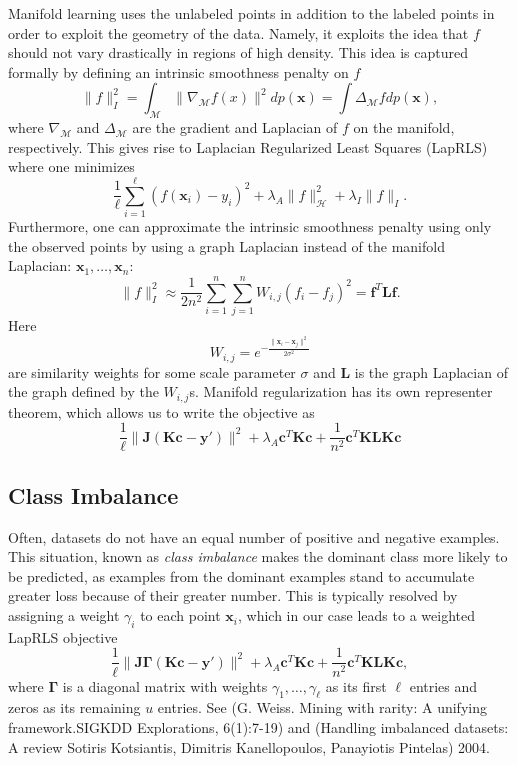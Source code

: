 \documentclass[anon,11pt]{9520} %
\newcommand{\mb}{\mathbf}
\begin{document}
Manifold learning uses the unlabeled points in addition to the labeled points in order to exploit the geometry of the data. \cite{Belkin} Namely, it exploits the idea that $f$ should not vary drastically in regions of high density. This idea is captured formally by defining an intrinsic smoothness penalty on $f$ \[\|f\|^2_{I} = \int_{\mathcal{M}} \|\nabla_{\mathcal{M}} f(x)\|^2 dp(\mb x) = \int\Delta_{\mathcal{M}}f dp(\mb x), \] where $\nabla_{\mathcal{M}}$ and $\Delta_{\mathcal{M}}$ are the gradient and Laplacian of $f$ on the manifold, respectively. This gives rise to Laplacian Regularized Least Squares (LapRLS) where one minimizes \[ \frac{1}{\ell} \sum_{i=1}^{\ell} (f(\mb{x}_i)-y_i)^2 + \lambda_A \|f\|_{\mathcal{H}}^2 + \lambda_I\|f\|_I.\] Furthermore, one can approximate the intrinsic smoothness penalty using only the observed points by using a graph Laplacian instead of the manifold Laplacian: $\mb x_1, \dots, \mb x_n$: \[\|f\|^2_I \approx \frac{1}{2n^2} \sum_{i=1}^{n} \sum_{j=1}^{n} W_{i,j}(f_i-f_j)^2 = \mb f^T \mb L \mb f.\] Here \[W_{i,j} = e^{-\frac{\|\mb{x}_i-\mb{x}_j\|^2}{2\sigma^2}}\] are similarity weights for some scale parameter $\sigma$ and $\mb L$ is the graph Laplacian of the graph defined by the $W_{i,j}$s. Manifold regularization has its own representer theorem, which allows us to write the objective as
\[ \frac{1}{\ell} \|\mb J(\mb K \mb c-\mb y')\|^2 + \lambda_A \mb c^T \mb K \mb c + \frac{1}{n^2} \mb c^T \mb K \mb L \mb K \mb c \]

\subsection{Class Imbalance}
Often, datasets do not have an equal number of positive and negative examples. This situation, known as {\em class imbalance} makes the dominant class more likely to be predicted, as examples from the dominant examples stand to accumulate greater loss because of their greater number. This is typically resolved by assigning a weight $\gamma_i$ to each point $\mb x_i$, which in our case leads to a weighted LapRLS objective
\[ \frac{1}{\ell} \|\mb J \mb \Gamma(\mb K \mb c-\mb y')\|^2 + \lambda_A \mb c^T \mb K \mb c + \frac{1}{n^2} \mb c^T \mb K \mb L \mb K \mb c,\] where $\mb \Gamma$ is a diagonal matrix with weights $\gamma_1,\dots,\gamma_{\ell}$ as its first $\ell$ entries and zeros as its remaining $u$ entries. See \cite{Weiss} (G. Weiss. Mining with rarity: A unifying framework.SIGKDD Explorations, 6(1):7-19) and \cite{Kotsiantis} (Handling imbalanced datasets: A review Sotiris Kotsiantis, Dimitris Kanellopoulos, Panayiotis Pintelas)
2004.
\end{document}
